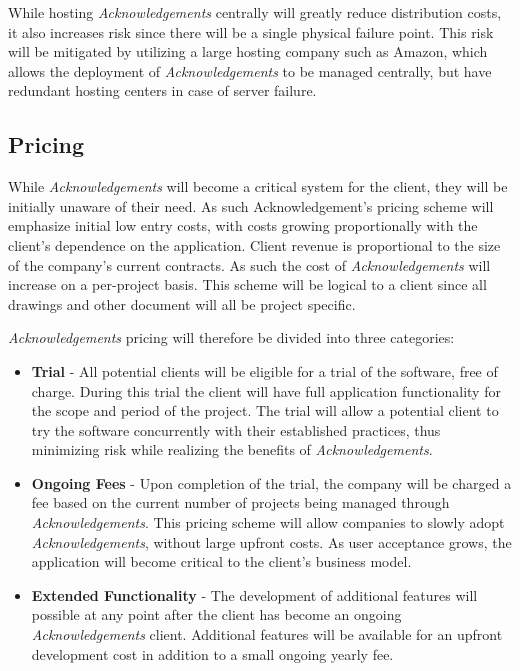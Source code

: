 While hosting {\it Acknowledgements} centrally will greatly reduce distribution costs, it also increases risk since there will be a single physical failure point. This risk will be mitigated by utilizing a large hosting company such as Amazon, which allows the deployment of {\it Acknowledgements} to be managed centrally, but have redundant hosting centers in case of server failure. 

\subsection{Pricing}
While {\it Acknowledgements} will become a critical system for the client, they will be initially unaware of their need. As such Acknowledgement's pricing scheme will emphasize initial low entry costs, with costs growing proportionally with the client's dependence on the application. Client revenue is proportional to the size of the company's current contracts. As such the cost of {\it Acknowledgements} will increase on a per-project basis. This scheme will be logical to a client since all drawings and other document will all be project specific.

{\it Acknowledgements} pricing will therefore be divided into three categories:

\begin{itemize}
\item \textbf{Trial} - All potential clients will be eligible for a trial of the software, free of charge. During this trial the client will have full application functionality for the scope and period of the project. The trial will allow a potential client to try the software concurrently with their established practices, thus minimizing risk while realizing the benefits of {\it Acknowledgements}.
\item \textbf{Ongoing Fees} - Upon completion of the trial, the company will be charged a fee based on the current number of projects being managed through {\it Acknowledgements}. This pricing scheme will allow companies to slowly adopt {\it Acknowledgements}, without large upfront costs. As user acceptance grows, the application will become critical to the client's business model.
\item \textbf{Extended Functionality} - The development of additional features will possible at any point after the client has become an ongoing {\it Acknowledgements} client. Additional features will be available for an upfront development cost in addition to a small ongoing yearly fee.
\end{itemize}